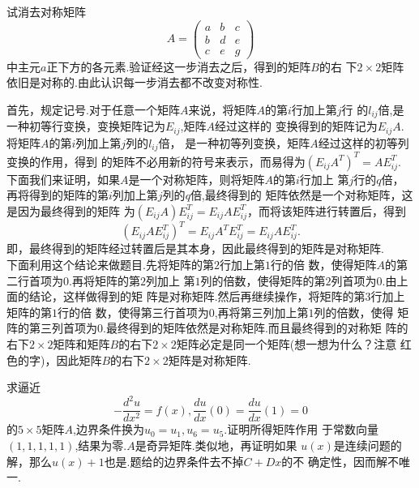 ﻿\documentclass{book} \usepackage{exsheets} \usepackage{xeCJK}
\begin{document}
\begin{question}
  试消去对称矩阵
$$
A=
\begin{pmatrix}
  a&b&c\\
  b&d&e\\
  c&e&g
\end{pmatrix}
$$
中主元$a$正下方的各元素.验证经这一步消去之后，得到的矩阵$B$的右
下$2\times 2$矩阵依旧是对称的.由此认识每一步消去都不改变对称性.
\end{question}
\begin{solution}
  首先，规定记号.对于任意一个矩阵$A$来说，将矩阵$A$的第$i$行加上第$j$行
  的$l_{ij}$倍,是一种初等行变换，变换矩阵记为$E_{ij}$,矩阵$A$经过这样的
  变换得到的矩阵记为$E_{ij}A$.将矩阵$A$的第$i$列加上第$j$列的$l_{ij}$倍，
  是一种初等列变换，矩阵$A$经过这样的初等列变换的作用，得到
  的矩阵不必用新的符号来表示，而易得为$(E_{ij}A^{T})^T=AE_{ij}^T$.\\

  下面我们来证明，如果$A$是一个对称矩阵，则将矩阵$A$的第$i$行加上
  第$j$行的$q$倍，再将得到的矩阵的第$i$列加上第$j$列的$q$倍,最终得到的
  矩阵依然是一个对称矩阵，这是因为最终得到的矩阵
  为$(E_{ij}A)E_{ij}^T=E_{ij}AE_{ij}^{T}$，而将该矩阵进行转置后，得到
$$
(E_{ij}AE_{ij}^{T})^T=E_{ij}A^TE_{ij}^{T}=E_{ij}AE_{ij}^T.
$$
即，最终得到的矩阵经过转置后是其本身，因此最终得到的矩阵是对称矩阵.\\

下面利用这个结论来做题目.先将矩阵的第$2$行加上第$1$行的倍
数，{\color{red}使得矩阵$A$的第二行首项为$0$}.再将矩阵的第$2$列加上
第$1$列的倍数，使得矩阵的第$2$列首项为$0$.由上面的结论，这样做得到的矩
阵是对称矩阵.然后再继续操作，将矩阵的第$3$行加上矩阵的第$1$行的倍
数，{\color{red}使得第三行首项为$0$},再将第三列加上第$1$列的倍数，使得
矩阵的第三列首项为$0$.最终得到的矩阵依然是对称矩阵.而且最终得到的对称矩
阵的右下$2\times
2$矩阵和矩阵$B$的右下$2\times 2$矩阵必定是同一个矩阵(想一想为什么？注意
红色的字)，因此矩阵$B$的右下$2\times 2$矩阵是对称矩阵.
\end{solution}
\begin{question}
  求逼近
$$
- \frac{d^2u}{dx^2}=f(x),\frac{du}{dx}(0)=\frac{du}{dx}(1)=0
$$
的$5\times 5$矩阵$A$,边界条件换为$u_0=u_1,u_6=u_{5}$.证明所得矩阵作用
于常数向量$(1,1,1,1,1)$,结果为零.$A$是奇异矩阵.类似地，再证明如果
$u(x)$是连续问题的解，那么$u(x)+1$也是.题给的边界条件去不掉$C+Dx$的不
确定性，因而解不唯一.
\end{question}
\end{document}
